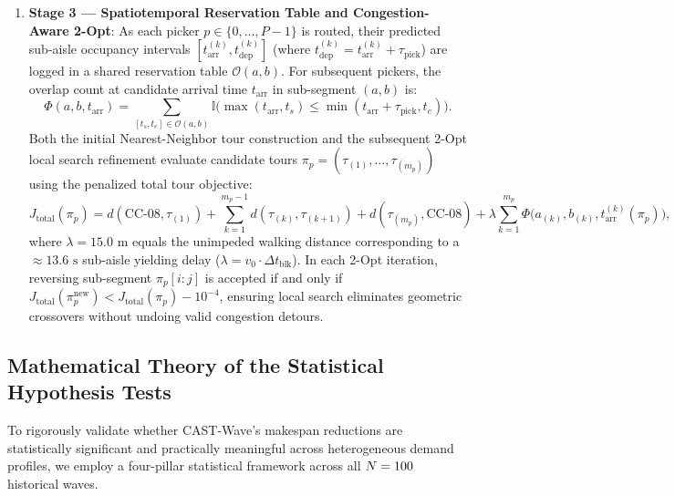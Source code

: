\documentclass[11pt,a4paper]{article}
\begin{document}
\begin{enumerate}[leftmargin=*]
    \item \textbf{Stage 3 --- Spatiotemporal Reservation Table and Congestion-Aware 2-Opt}:
    As each picker $p \in \{0, \dots, P-1\}$ is routed, their predicted sub-aisle occupancy intervals $[t_{\text{arr}}^{(k)}, t_{\text{dep}}^{(k)}]$ (where $t_{\text{dep}}^{(k)} = t_{\text{arr}}^{(k)} + \tau_{\text{pick}}$) are logged in a shared reservation table $\mathcal{O}(a, b)$. For subsequent pickers, the overlap count at candidate arrival time $t_{\text{arr}}$ in sub-segment $(a, b)$ is:
    \begin{equation}
        \Phi(a, b, t_{\text{arr}}) = \sum_{[t_s, t_e] \in \mathcal{O}(a, b)} \mathbb{I}\Big( \max(t_{\text{arr}}, t_s) \le \min(t_{\text{arr}} + \tau_{\text{pick}}, t_e) \Big).
    \end{equation}
    Both the initial Nearest-Neighbor tour construction and the subsequent 2-Opt local search refinement evaluate candidate tours $\pi_p = (\tau_{(1)}, \dots, \tau_{(m_p)})$ using the penalized total tour objective:
    \begin{equation}
        J_{\text{total}}(\pi_p) = d(\text{CC-08}, \tau_{(1)}) + \sum_{k=1}^{m_p - 1} d(\tau_{(k)}, \tau_{(k+1)}) + d(\tau_{(m_p)}, \text{CC-08}) + \lambda \sum_{k=1}^{m_p} \Phi\big(a_{(k)}, b_{(k)}, t_{\text{arr}}^{(k)}(\pi_p)\big),
    \end{equation}
    where $\lambda = 15.0\text{ m}$ equals the unimpeded walking distance corresponding to a $\approx 13.6\text{ s}$ sub-aisle yielding delay ($\lambda = v_0 \cdot \Delta t_{\text{blk}}$). In each 2-Opt iteration, reversing sub-segment $\pi_p[i:j]$ is accepted if and only if $J_{\text{total}}(\pi_p^{\text{new}}) < J_{\text{total}}(\pi_p) - 10^{-4}$, ensuring local search eliminates geometric crossovers without undoing valid congestion detours.
\end{enumerate}

\subsection{Mathematical Theory of the Statistical Hypothesis Tests}
\label{sec:statistical_theory}
To rigorously validate whether CAST-Wave's makespan reductions are statistically significant and practically meaningful across heterogeneous demand profiles, we employ a four-pillar statistical framework across all $N = 100$ historical waves.
\end{document}
